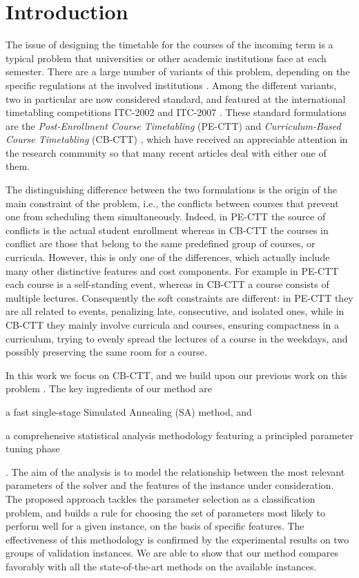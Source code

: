 \documentclass[authoryear,12pt]{article}
\newcommand{\cbctt}{CB-CTT}
\newcommand{\pectt}{PE-CTT}
\begin{document}
\section{Introduction}

The issue of designing the timetable for the courses of the incoming term is a
typical problem that universities or other academic institutions face at each
semester. There are a large number of variants of this problem, depending on the
specific regulations at the involved institutions \citep[see,
e.g.,][]{King13,Lewi08,Scha99}.
%
Among the different variants, two in particular are now considered standard, and
featured at the international timetabling competitions ITC-2002 and ITC-2007
\citep{MSPM10}. These standard formulations are the \emph{Post-Enrollment Course
Timetabling} (\pectt{}) \citep{LePM07} and \emph{Curri\-cu\-lum-Based Course
Timetabling} (\cbctt{}) \citep{DiMS07}, which have received an appreciable
attention in the research community so that many recent articles deal with
either one of them.

The distinguishing difference between the two formulations is the origin of the
main constraint of the problem, i.e., the conflicts between courses that prevent
one from scheduling them simultaneously. Indeed, in \pectt{} the source of
conflicts is the actual student enrollment whereas in \cbctt{} the courses in
conflict are those that belong to the same predefined group of courses, or
curricula.  However, this is only one of the differences, which actually include
many other distinctive features and cost components. For example in \pectt{}
each course is a self-standing event, whereas in \cbctt{} a course consists of
multiple lectures.  Consequently the soft constraints are different: in \pectt{}
they are all related to events, penalizing late, consecutive, and isolated ones,
while in \cbctt{} they mainly involve curricula and courses, ensuring
compactness in a curriculum, trying to evenly spread the lectures of a course in
the weekdays, and possibly preserving the same room for a course.

In this work we focus on \cbctt{}, and we build upon our previous work on this
problem \citep{BeDS12}. The key ingredients of our method are
\begin{inparaenum}\item a fast single-stage Simulated
Annealing (SA) method, and \item a comprehensive statistical analysis
methodology featuring a principled parameter tuning phase\end{inparaenum}.
%
The aim of the analysis is to model the relationship between the most relevant
parameters of the solver and the features of the instance under consideration.
The proposed approach tackles the parameter selection as a classification
problem, and builds a rule for choosing the set of parameters most likely to
perform well for a given instance, on the basis of specific features.
%
The effectiveness of this methodology is confirmed by the experimental results
on two groups of validation instances. We are able to show that our method
compares favorably with all the state-of-the-art methods on the available
instances.
%
\end{document}
